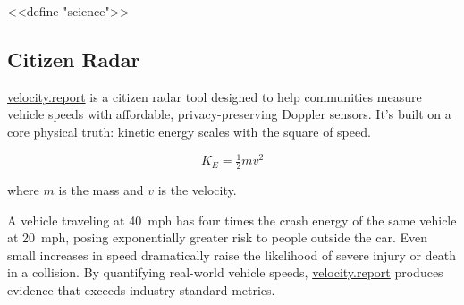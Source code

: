 <<define "science">>
\subsection*{Citizen Radar}
\href{https://velocity.report}{velocity.report} is a citizen radar tool designed to help communities measure vehicle speeds with affordable, privacy-preserving Doppler sensors. It's built on a core physical truth: kinetic energy scales with the square of speed.
\par
\begin{minipage}{\linewidth}
\[ K_E = \tfrac{1}{2} m v^2 \]
\par
\begin{center}
where \(m\) is the mass and \(v\) is the velocity.
\end{center}
\end{minipage}
\par
\vspace{4pt}
A vehicle traveling at 40~mph has four times the crash energy of the same vehicle at 20~mph, posing exponentially greater risk to people outside the car. Even small increases in speed dramatically raise the likelihood of severe injury or death in a collision. By quantifying real-world vehicle speeds, \href{https://velocity.report}{velocity.report} produces evidence that exceeds industry standard metrics.
\par

